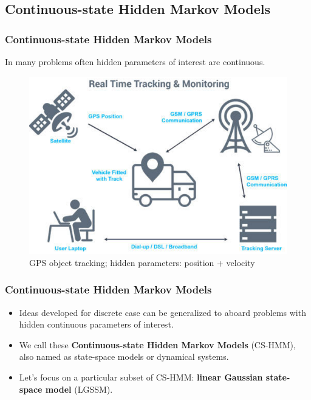 \documentclass[xcolor=dvipsnames, compress]{beamer}
\begin{document}
\begin{frame}
\section{Continuous-state Hidden Markov Models}
\frametitle{Continuous-state Hidden Markov Models}

In many problems often hidden parameters of interest are continuous. 

\begin{figure}
	\includegraphics[scale=0.45]{gps_cut.png}
	\caption{GPS object tracking; hidden parameters: position + velocity}
\end{figure}
\end{frame}

\begin{frame}
\frametitle{Continuous-state Hidden Markov Models}
\begin{itemize}	

	\item Ideas developed for discrete case can be generalized to aboard problems with hidden continuous parameters of interest.\vspace{0.5cm}
	\item We call these \textbf{Continuous-state Hidden Markov Models} (CS-HMM), also named as state-space models or dynamical systems.\vspace{0.5cm}
	\item Let's focus on a particular subset of CS-HMM: \textbf{linear Gaussian state-space model} (LGSSM).
\end{itemize}

\end{frame}
\end{document}
